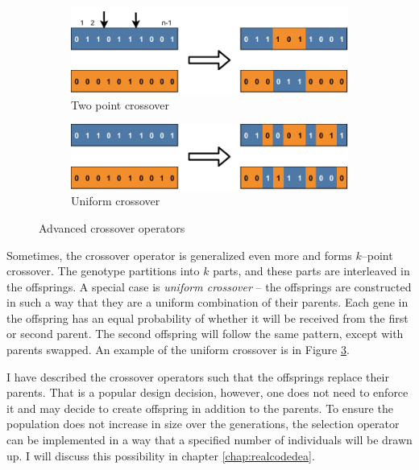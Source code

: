 \begin{figure}
    \begin{subfigure}[b]{0.4\textwidth}
        \includegraphics[width=\textwidth]{img/master_twopointcrossover.pdf}
        \caption{Two point crossover}
        \label{fig:gatwopointcrossover}
    \end{subfigure}
    \hfill
    \begin{subfigure}[b]{0.4\textwidth}
        \includegraphics[width=\textwidth]{img/master_uniformcrossover.pdf}
        \caption{Uniform crossover}
        \label{fig:uniformcrossover}
    \end{subfigure}
    \caption{Advanced crossover operators}
\end{figure}

Sometimes, the crossover operator is generalized even more and forms $k$--point crossover. The genotype partitions into $k$ parts, and these parts are interleaved in the offsprings. A special case is \emph{uniform crossover} -- the offsprings are constructed in such a way that they are a uniform combination of their parents. Each gene in the offspring has an equal probability of whether it will be received from the first or second parent. The second offspring will follow the same pattern, except with parents swapped. An example of the uniform crossover is in Figure \ref{fig:uniformcrossover}.

I have described the crossover operators such that the offsprings replace their parents. That is a popular design decision, however, one does not need to enforce it and may decide to create offspring in addition to the parents. To ensure the population does not increase in size over the generations, the selection operator can be implemented in a way that a specified number of individuals will be drawn up. I will discuss this possibility in chapter \ref{chap:realcodedea}.

